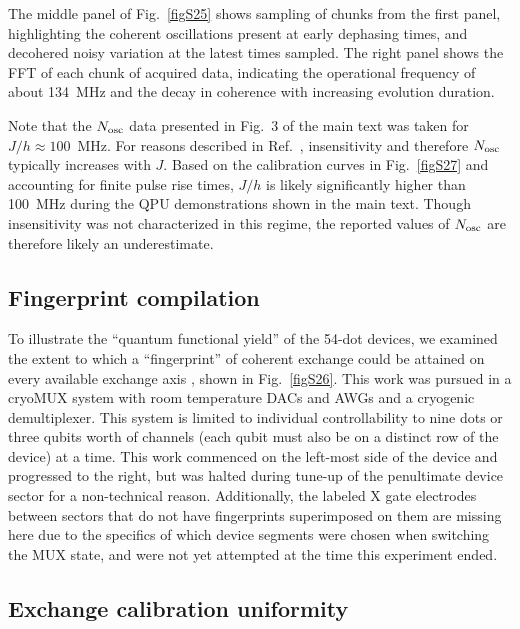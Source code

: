\documentclass[aps,prl,twocolumn,superscriptaddress,nobibnotes,10pt,floatfix]{revtex4-2}
\newcommand{\figref}[1]{Fig.~\ref{#1}}
\newcommand{\ts}[2]{{#1}_{\textnormal{#2}}}
\newcommand{\Nosc}{\ensuremath{\ts{N}{osc}}}
\begin{document}
The middle panel of \figref{figS25} shows sampling of chunks from the first panel, highlighting the coherent oscillations present at early dephasing times, and decohered noisy variation at the latest times sampled.
The right panel shows the FFT of each chunk of acquired data, indicating the operational frequency of  about 134~MHz and the decay in coherence with increasing evolution duration.

Note that the \(\Nosc\) data presented in Fig.~3 of the main text was taken for \({J}/{h} \approx 100\)~MHz.
For reasons described in Ref.~\cite{s_reed_reduced_2016}, insensitivity and therefore \(\ts{N}{osc}\) typically increases with \(J\).
Based on the calibration curves in \figref{figS27} and accounting for finite pulse rise times, \(J/h\) is likely significantly higher than 100~MHz during the QPU demonstrations shown in the main text.
Though insensitivity was not characterized in this regime, the reported values of \(\ts{N}{osc}\ \)are therefore likely an underestimate.



\subsection{Fingerprint compilation}\label{fingerprint-compilation}

To illustrate the ``quantum functional yield'' of the 54-dot devices, we examined the extent to which a ``fingerprint'' of coherent exchange could be attained on every available exchange axis \cite{s_reichardt_422_2025}, shown in \figref{figS26}.
This work was pursued in a cryoMUX system with room temperature DACs and AWGs and a cryogenic demultiplexer.
This system is limited to individual controllability to nine dots or three qubits worth of channels (each qubit must also be on a distinct row of the device) at a time.
This work commenced on the left-most side of the device and progressed to the right, but was halted during tune-up of the penultimate device sector for a non-technical reason.
Additionally, the labeled X gate electrodes between sectors that do not have fingerprints superimposed on them are missing here due to the specifics of which device segments were chosen when switching the MUX state, and were not yet attempted at the time this experiment ended.


\subsection{Exchange calibration uniformity}\label{exchange-calibration-uniformity}
\end{document}
